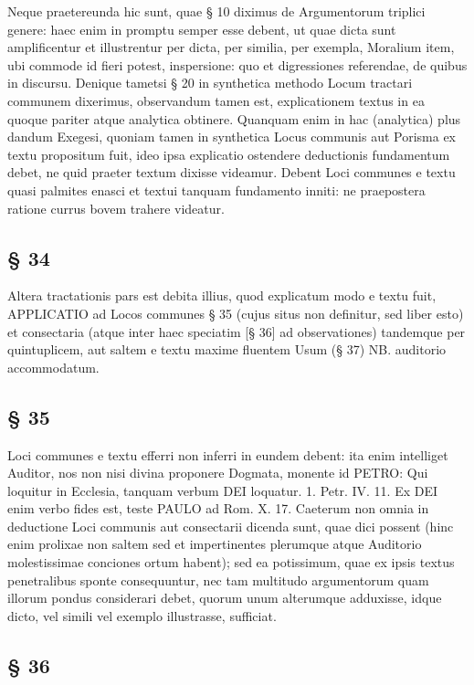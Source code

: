 Neque praetereunda hic sunt, quae § 10 diximus de Argumentorum triplici genere: haec enim in promptu semper esse debent, ut quae dicta sunt amplificentur et
illustrentur per dicta, per similia, per exempla, Moralium item, ubi commode id fieri potest, inspersione: quo et digressiones referendae, de quibus in discursu. Denique tametsi § 20 in synthetica methodo Locum tractari communem dixerimus, observandum tamen est, explicationem textus in ea quoque pariter atque analytica obtinere. Quanquam enim in hac (analytica) plus dandum Exegesi, quoniam tamen in synthetica Locus communis aut Porisma ex textu propositum fuit, ideo ipsa explicatio ostendere deductionis fundamentum debet, ne quid praeter textum dixisse videamur. Debent Loci communes e textu quasi palmites enasci et textui tanquam fundamento inniti: ne praepostera ratione currus bovem trahere videatur.

\subsection{§ 34}

Altera tractationis pars est debita illius, quod explicatum modo e textu fuit, APPLICATIO ad Locos communes § 35 (cujus situs non definitur, sed liber esto) et consectaria (atque inter haec speciatim [§ 36] ad observationes) tandemque per quintuplicem, aut saltem e textu maxime fluentem Usum (§ 37) NB. auditorio accommodatum.

\subsection{§ 35}

Loci communes e textu efferri non inferri in eundem debent: ita enim intelliget Auditor, nos non nisi divina proponere Dogmata, monente id PETRO: Qui loquitur in Ecclesia, tanquam verbum DEI loquatur. 1. Petr. IV. 11. Ex DEI enim verbo fides est, teste PAULO ad Rom. X. 17. Caeterum non omnia in deductione Loci communis aut consectarii dicenda sunt, quae dici possent (hinc enim prolixae non saltem sed et
impertinentes plerumque atque Auditorio molestissimae conciones ortum habent); sed ea potissimum, quae ex ipsis textus penetralibus sponte consequuntur, nec tam multitudo argumentorum quam illorum pondus considerari debet, quorum unum alterumque adduxisse, idque dicto, vel simili vel exemplo illustrasse, sufficiat.

\subsection{§ 36}

